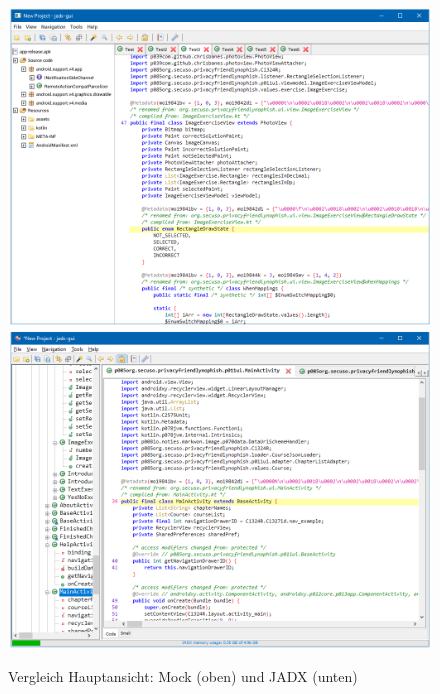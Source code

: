 \begin{figure}[p]
    \centering
    \includegraphics[height=.45\textheight]{bilder/jadx_mock_main.png}
    \includegraphics[height=.45\textheight]{bilder/jadx_main.png}
    \caption{Vergleich Hauptansicht: Mock (oben) und JADX (unten)}
    \label{fig:mock_comparison}
\end{figure}

